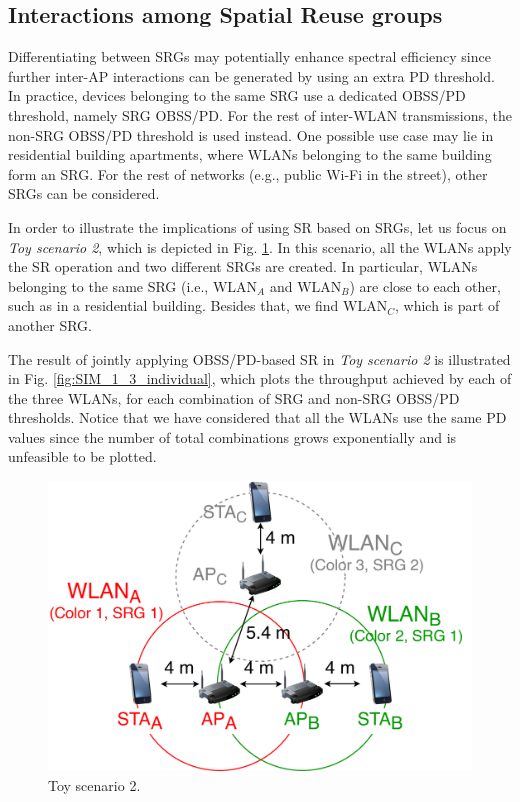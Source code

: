 \documentclass[comsoc]{IEEEtran}
\begin{document}
	\subsection{Interactions among Spatial Reuse groups}
	\label{section:advanced_interactions}
		
	Differentiating between SRGs may potentially enhance spectral efficiency since further inter-AP interactions can be generated by using an extra PD threshold. In practice, devices belonging to the same SRG use a dedicated OBSS/PD threshold, namely SRG OBSS/PD. For the rest of inter-WLAN transmissions, the non-SRG OBSS/PD threshold is used instead. One possible use case may lie in residential building apartments, where WLANs belonging to the same building form an SRG. For the rest of networks (e.g., public Wi-Fi in the street), other SRGs can be considered.
	
	In order to illustrate the implications of using SR based on SRGs, let us focus on \emph{Toy scenario 2}, which is depicted in Fig. \ref{fig:toy_scenario_2}. In this scenario, all the WLANs apply the SR operation and two different SRGs are created. In particular, WLANs belonging to the same SRG (i.e., $\text{WLAN}_A$ and $\text{WLAN}_B$) are close to each other, such as in a residential building. Besides that, we find $\text{WLAN}_C$, which is part of another SRG. 
	
	The result of jointly applying OBSS/PD-based SR in \emph{Toy scenario 2} is illustrated in Fig. \ref{fig:SIM_1_3_individual}, which plots the throughput achieved by each of the three WLANs, for each combination of SRG and non-SRG OBSS/PD thresholds. Notice that we have considered that all the WLANs use the same PD values since the number of total combinations grows exponentially and is unfeasible to be plotted.
	
	\begin{figure}[ht!]
		\centering
		\includegraphics[width=0.8\columnwidth]{fig_18}
		\caption{Toy scenario 2.}
		\label{fig:toy_scenario_2}
	\end{figure}
\end{document}
